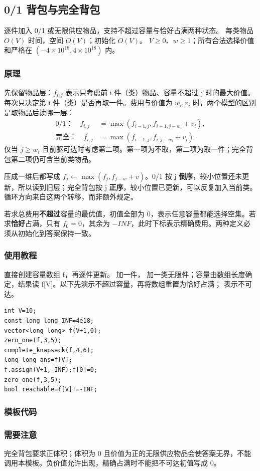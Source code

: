 \subsection{0/1 背包与完全背包}
\label{dp:knapsack}
\AlgorithmInfo
    {逐件加入 0/1 或无限供应物品，支持不超过容量与恰好占满两种状态。}
    {每类物品 $O(V)$ 时间，空间 $O(V)$；初始化 $O(V)$。}
    {$V\ge0$、$w\ge1$；所有合法选择价值和严格在 $(-4\times10^{18},4\times10^{18})$ 内。}
\subsubsection*{原理}

先保留物品层：$f_{i,j}$ 表示只考虑前 i 件（类）物品、容量不超过 j 时的最大价值。每次只决定第 i 件（类）是否再取一件。费用与价值为 $w_i,v_i$ 时，两个模型的区别是取物品后读哪一层：
\[
\begin{aligned}
\text{0/1：}\quad f_{i,j}&=\max(f_{i-1,j},f_{i-1,j-w_i}+v_i),\\
\text{完全：}\quad f_{i,j}&=\max(f_{i-1,j},f_{i,j-w_i}+v_i).
\end{aligned}
\]
仅当 $j\ge w_i$ 且前驱可达时考虑第二项。第一项为不取，第二项为取一件；完全背包第二项仍可含当前类物品。

压成一维后都写成 $f_j\gets\max(f_j,f_{j-w}+v)$。0/1 按 j \textbf{倒序}，较小位置还未更新，所以读到旧层；完全背包按 j \textbf{正序}，较小位置已更新，可以反复加入当前类。循环方向来自这两个转移，而非额外规定。

若求总费用\textbf{不超过}容量的最优值，初值全部为 0，表示任意容量都能选择空集。若求\textbf{恰好}占满，只有 $f_0=0$，其余为 $-INF$，此时下标表示精确费用。两种定义必须从初始化到答案保持一致。

\subsubsection*{使用教程}
直接创建容量数组 f，再逐件更新。 加一件， 加一类无限件；容量由数组长度确定，结果读 f[V]。以下先演示不超过容量，再将数组重置为恰好占满； 表示不可达。
\begin{lstlisting}[style=mtycpp,numbers=none]
int V=10;
const long long INF=4e18;
vector<long long> f(V+1,0);
zero_one(f,3,5);
complete_knapsack(f,4,6);
long long ans=f[V];
f.assign(V+1,-INF);f[0]=0;
zero_one(f,3,5);
bool reachable=f[V]!=-INF;
\end{lstlisting}
\subsubsection*{模板代码}
\subsubsection*{需要注意}
完全背包要求正体积；体积为 0 且价值为正的无限供应物品会使答案无界，不能调用本模板。负价值允许出现，精确占满时不能把不可达初值写成 0。

